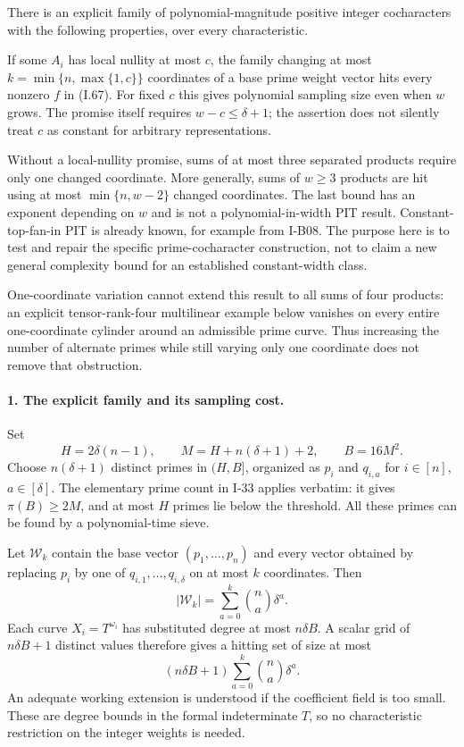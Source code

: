 There is an explicit family of polynomial-magnitude positive
integer cocharacters with the following properties, over every
characteristic.

If some $A_i$ has local nullity at most $c$, the family changing
at most $k=\min\{n,\max\{1,c\}\}$ coordinates of a base prime
weight vector hits every nonzero $f$ in (I.67). For fixed $c$
this gives polynomial sampling size even when $w$ grows. The
promise itself requires $w-c\le\delta+1$; the assertion does not
silently treat $c$ as constant for arbitrary representations.

Without a local-nullity promise, sums of at most three separated
products require only one changed coordinate. More generally,
sums of $w\ge3$ products are hit using at most
$\min\{n,w-2\}$ changed coordinates. The last bound has an
exponent depending on $w$ and is not a polynomial-in-width PIT
result. Constant-top-fan-in PIT is already known, for example
from I-B08. The purpose here is to test and repair the specific
prime-cocharacter construction, not to claim a new general
complexity bound for an established constant-width class.

One-coordinate variation cannot extend this result to all sums
of four products: an explicit tensor-rank-four multilinear
example below vanishes on every entire one-coordinate cylinder
around an admissible prime curve. Thus increasing the number of
alternate primes while still varying only one coordinate does
not remove that obstruction.

\paragraph{1. The explicit family and its sampling cost.}
Set
\[
 H=2\delta(n-1),\qquad
 M=H+n(\delta+1)+2,\qquad B=16M^2.
\]
Choose $n(\delta+1)$ distinct primes in $(H,B]$, organized as
$p_i$ and $q_{i,a}$ for $i\in[n]$, $a\in[\delta]$.
The elementary prime count in I-33 applies verbatim: it gives
$\pi(B)\ge2M$, and at most $H$ primes lie below the threshold.
All these primes can be found by a polynomial-time sieve.

Let $\mathcal W_k$ contain the base vector $(p_1,\ldots,p_n)$
and every vector obtained by replacing $p_i$ by one of
$q_{i,1},\ldots,q_{i,\delta}$ on at most $k$ coordinates.
Then
\[
 |\mathcal W_k|=
 \sum_{a=0}^{k}\binom na\delta^a.
 \tag{I.68}
\]
Each curve $X_i=T^{\omega_i}$ has substituted degree at most
$n\delta B$. A scalar grid of $n\delta B+1$ distinct values
therefore gives a hitting set of size at most
\[
 (n\delta B+1)\sum_{a=0}^{k}\binom na\delta^a.
 \tag{I.69}
\]
An adequate working extension is understood if the coefficient
field is too small. These are degree bounds in the formal
indeterminate $T$, so no characteristic restriction on the
integer weights is needed.

